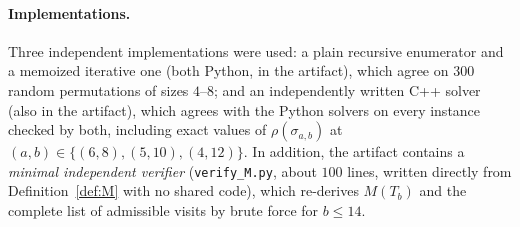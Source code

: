 \documentclass[11pt]{article}
\theoremstyle{definition}
\begin{document}
\paragraph{Implementations.} Three independent implementations were used: a plain
recursive enumerator and a memoized iterative one (both Python, in the artifact), which
agree on $300$ random permutations of sizes $4$--$8$; and an independently written C++
solver (also in the artifact), which agrees with the
Python solvers on every instance checked by both, including exact values of
$\rho(\sigma_{a,b})$ at $(a,b) \in \{(6,8), (5,10), (4,12)\}$. In addition, the
artifact contains a
\emph{minimal independent verifier} (\texttt{verify\_M.py}, about $100$ lines, written
directly from Definition~\ref{def:M} with no shared code), which re-derives $M(T_b)$ and
the complete list of admissible visits by brute force for $b \le 14$.
\end{document}
